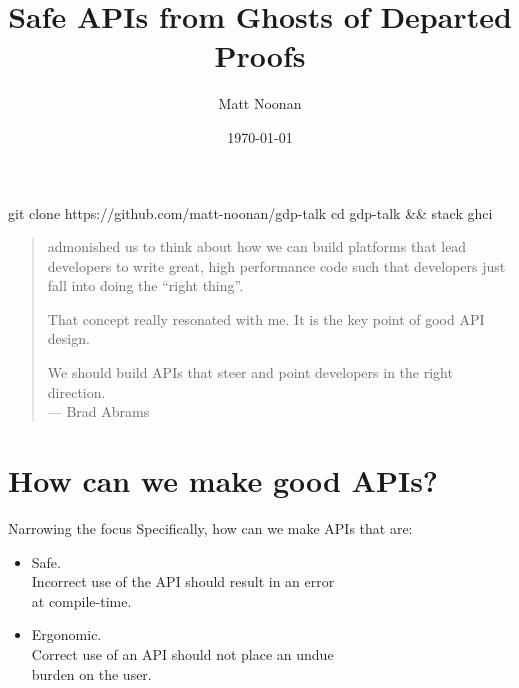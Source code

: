 \documentclass{beamer}
\title{Safe APIs from Ghosts of Departed Proofs}
\date{\today}
\author{Matt Noonan}
\institute{Kataskeue LLC \& Input Output HK}
\begin{document}
\begin{myverbbox}[\scriptsize]{\github}
git clone https://github.com/matt-noonan/gdp-talk
cd gdp-talk && stack ghci
\end{myverbbox}

\begin{frame}
\maketitle
{}
\end{frame}

\usebackgroundtemplate{}

\begin{frame}{}
  \begin{quotation}
 admonished us to think about
how we can build platforms that lead developers
to write great, high performance code such that
developers just fall into doing the “right thing”.
\medskip

\noindent
That concept really resonated with me. It is the
key point of good API design.
\bigskip

\noindent
\alert{We should build
APIs that steer and point developers in the right
direction.}\\
\phantom{x} \hfill — Brad Abrams
  \end{quotation}
  
\end{frame}

  \section{How can we make good APIs?}   %

\begin{frame}{Narrowing the focus}
  Specifically, how can we make APIs that are:
  \begin{itemize}
    \bigskip
  \item {\alert{Safe.} \\ \qquad Incorrect use of the API should result in an error
    \\ \qquad at compile-time.}
    \bigskip
  \item {\alert{Ergonomic.} \\ \qquad Correct use of an API should not place an undue \\
    \qquad burden on the user.}
    \end{itemize}
\end{frame}
\end{document}
